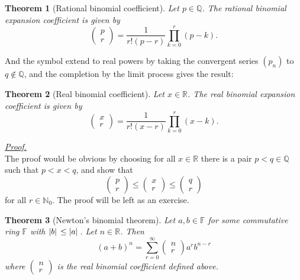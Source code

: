 \documentclass[12pt]{article}
\newtheorem*{theorem}{Theorem}
\renewenvironment{proof}[1][Proof]{\begin{snugshade*} \underline{\textit{{#1}.}}\\}{\hfill \qedsymbol \end{snugshade*}}
\begin{document}
    \begin{theorem}[Rational binomial coefficient]
        Let $p\in\mathbb{Q}$. The rational binomial expansion coefficient is given by \[\begin{pmatrix}
            p\\r
        \end{pmatrix}=\frac{1}{r!(p-r)}\prod_{k=0}^{r}(p-k).\]
    \end{theorem}

    And the symbol extend to real powers by taking the convergent series $(p_n)$ to $q\notin\mathbb{Q}$, and the completion by the limit process gives the result:

    \begin{theorem}[Real binomial coefficient]
        Let $x\in\mathbb{R}$. The real binomial expansion coefficient is given by \[\begin{pmatrix}
            x\\r
        \end{pmatrix}=\frac{1}{r!(x-r)}\prod_{k=0}^{r}(x-k).\]
    \end{theorem}

    \begin{proof}
        The proof would be obvious by choosing for all $x\in \mathbb{R}$ there is a pair $p<q\in\mathbb{Q}$ such that $p<x<q$, and show that \[\begin{pmatrix}
            p\\r
        \end{pmatrix}\leq\begin{pmatrix}
            x\\r
        \end{pmatrix}\leq\begin{pmatrix}
            q\\r
        \end{pmatrix}\] for all $r\in \mathbb{N}_0$. The proof will be left as an exercise.
    \end{proof}

    \begin{theorem}[Newton's binomial theorem]
        Let $a,b\in\mathbb{F}$ for some commutative ring $\mathbb{F}$ with $\abs*{b}\leq \abs*{a}$. Let $n\in\mathbb{R}$. Then \[(a+b)^n=\sum_{r=0}^{\infty}\begin{pmatrix}
            n\\r
        \end{pmatrix}a^r b^{n-r}\] where $\begin{pmatrix}
            n\\r
        \end{pmatrix}$ is the real binomial coefficient defined above.
    \end{theorem}
\end{document}
